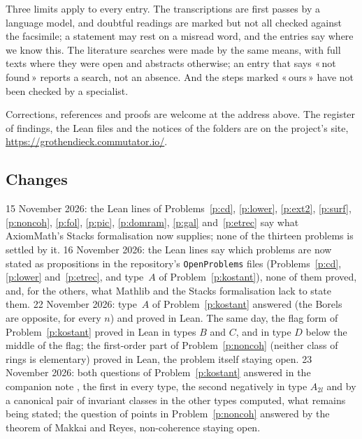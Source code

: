 \documentclass[11pt]{article}
\newcommand{\q}[1]{«\,#1\,»}
\theoremstyle{definition}
\theoremstyle{plain}\newtheorem*{proposition}{Proposition}\theoremstyle{definition}
\begin{document}
Three limits apply to every entry. The transcriptions are first passes by a language model, and doubtful readings are marked but not all checked against the facsimile; a statement may rest on a misread word, and the entries say where we know this. The literature searches were made by the same means, with full texts where they were open and abstracts otherwise; an entry that says \q{not found} reports a search, not an absence. And the steps marked \q{ours} have not been checked by a specialist.

Corrections, references and proofs are welcome at the address above. The register of findings, the Lean files and the notices of the folders are on the project's site, \url{https://grothendieck.commutator.io/}.

\subsection*{Changes}
15 November 2026: the Lean lines of Problems~\ref{p:cd}, \ref{p:lower}, \ref{p:ext2}, \ref{p:surf}, \ref{p:noncoh}, \ref{p:fol}, \ref{p:pic}, \ref{p:domram}, \ref{p:gal} and~\ref{p:etrec} say what AxiomMath's Stacks formalisation \cite{axiomstacks} now supplies; none of the thirteen problems is settled by it. 16 November 2026: the Lean lines say which problems are now stated as propositions in the repository's \texttt{OpenProblems} files (Problems~\ref{p:cd}, \ref{p:lower} and~\ref{p:etrec}, and type~$A$ of Problem~\ref{p:kostant}), none of them proved, and, for the others, what Mathlib and the Stacks formalisation lack to state them. 22 November 2026: type~$A$ of Problem~\ref{p:kostant} answered (the Borels are opposite, for every $n$) and proved in Lean. The same day, the flag form of Problem~\ref{p:kostant} proved in Lean in types $B$ and $C$, and in type $D$ below the middle of the flag; the first-order part of Problem~\ref{p:noncoh} (neither class of rings is elementary) proved in Lean, the problem itself staying open. 23 November 2026: both questions of Problem~\ref{p:kostant} answered in the companion note \cite{kostantnote}, the first in every type, the second negatively in type $A_{2l}$ and by a canonical pair of invariant classes in the other types computed, what remains being stated; the question of points in Problem~\ref{p:noncoh} answered by the theorem of Makkai and Reyes, non-coherence staying open.
\end{document}
